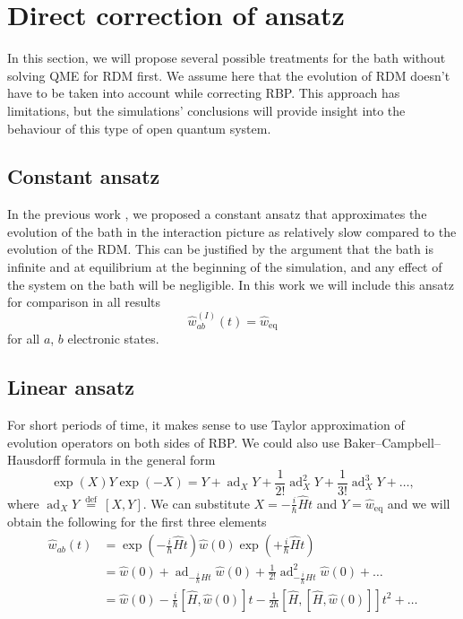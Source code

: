 \section{Direct correction of ansatz }
In this section, we will propose several possible treatments for the bath without solving QME for RDM first. We assume here that the evolution of RDM doesn't have to be taken into account while correcting RBP. This approach has limitations, but the simulations' conclusions will provide insight into the behaviour of this type of open quantum system. 

\label{Direct correction of ansatz }
\subsection{Constant ansatz}
In the previous work \cite{herman_elektron-fononova_2020}, we proposed a constant ansatz that approximates the evolution of the bath in the interaction picture as relatively slow compared to the evolution of the RDM. This can be justified by the argument that the bath is infinite and at equilibrium at the beginning of the simulation, and any effect of the system on the bath will be negligible. In this work we will include this ansatz for comparison in all results
\begin{equation}
\label{constant_ansatz}
    \hat{w}^{(I)}_{ab}(t) = \hat{w}_\text{eq}
\end{equation}
for all $a$, $b$ electronic states.

\subsection{Linear ansatz}
For short periods of time, it makes sense to use Taylor approximation of evolution operators on both sides of RBP. We could also use Baker–Campbell–Hausdorff formula in the general form
\begin{equation}
\exp (X) Y \exp (-X) = Y+\operatorname{ad}_{X} Y+\frac{1}{2 !} \operatorname{ad}_{X}^{2} Y+\frac{1}{3 !} \operatorname{ad}_{X}^{3} Y+\ldots,
\end{equation}
where $\operatorname{ad}_{X} Y \stackrel{\text { def }}{=}[X, Y]$. We can substitute $X=-\frac{i}{\hbar} \hat{H} t$ and $Y=\hat{w}_\text{eq}$ and we will obtain the following for the first three elements
\begin{equation}
    \begin{aligned}
    \hat{w}_{ab}(t)  &= \exp (-\frac{i}{\hbar} \hat{H} t) \hat{w}(0) \exp (+\frac{i}{\hbar} \hat{H} t) \\
    &= \hat{w}(0) + \operatorname{ad}_{-\frac{i}{\hbar} H t} \hat{w}(0)+\frac{1}{2 !} \operatorname{ad}_{-\frac{i}{\hbar} H t}^{2} \hat{w}(0) +\ldots \\
    &= \hat{w}(0) -\frac{i}{\hbar} \left[ \hat{H}, \hat{w}(0)\right] t  - \frac{1}{2 \hbar} \left[ \hat{H}, \left[\hat{H}, \hat{w}(0)\right]\right]t^2 +\ldots \\
    \end{aligned}
\end{equation}

